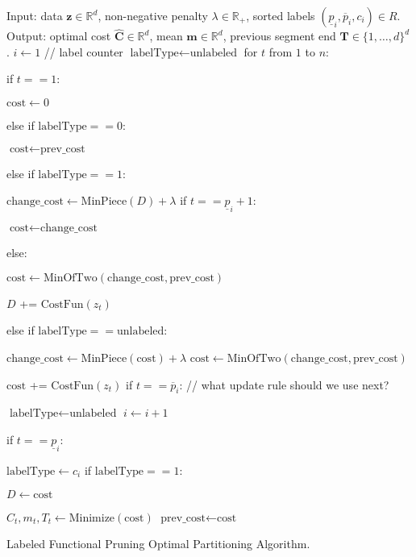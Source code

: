 \documentclass{article}
\newcommand{\RR}{\mathbb R}
\begin{document}
\begin{algorithm}[H]
\begin{algorithmic}[1]
\STATE Input: data $\mathbf z\in\mathbb R^d$, 
non-negative penalty $\lambda\in\RR_+$,
sorted labels $(\underline p_i, \overline p_i, c_i)\in R$.
\STATE Output: optimal cost $\hat{\mathbf C}\in\mathbb R^d$,
mean $\mathbf m\in\mathbb R^d$,
previous segment end $\mathbf T\in\{1,\dots,d\}^d$. 
\STATE $i\gets 1$ // label counter
\STATE $\text{labelType}\gets\text{unlabeled}$
\STATE for $t$ from $1$ to $n$:
\begin{ALC@g}
  \STATE if $t==1$:
  \begin{ALC@g}
    \STATE $\text{cost}\gets 0$
  \end{ALC@g}
  \STATE else if $\text{labelType}==0$:
  \begin{ALC@g}
    \STATE $\text{cost}\gets\text{prev\_cost}$
  \end{ALC@g}
  \STATE else if $\text{labelType}==1$:
  \begin{ALC@g}
    \STATE $\text{change\_cost}\gets \text{MinPiece}(D) + \lambda$
    \STATE if $t==\underline p_i+1$:
    \begin{ALC@g}
      \STATE $\text{cost}\gets\text{change\_cost}$
    \end{ALC@g}
    \STATE else:
    \begin{ALC@g}
      \STATE $\text{cost}\gets\text{MinOfTwo}(
      \text{change\_cost}, \text{prev\_cost})$
    \end{ALC@g}
    \STATE $D$ += $\text{CostFun}(z_t)$
  \end{ALC@g}
  \STATE else if $\text{labelType}==\text{unlabeled}$:
  \begin{ALC@g}
    \STATE $\text{change\_cost}\gets\text{MinPiece}(\text{cost}) + \lambda$
    \STATE $\text{cost}\gets\text{MinOfTwo}( 
    \text{change\_cost}, \text{prev\_cost})$
  \end{ALC@g}
  \STATE $\text{cost}$ += $\text{CostFun}(z_t)$
  \STATE if $t==\overline p_i$: // what update rule should we use next?
  \begin{ALC@g}
    \STATE $\text{labelType}\gets \text{unlabeled}$
    \STATE $i\gets i+1$
  \end{ALC@g}
  \STATE if $t==\underline p_i$:
  \begin{ALC@g}
    \STATE $\text{labelType}\gets c_i$
    \STATE if $\text{labelType}==1$:
    \begin{ALC@g}
      \STATE $D\gets \text{cost}$
    \end{ALC@g}
  \end{ALC@g}
  \STATE $\hat C_t, m_t, T_t\gets \text{Minimize}(\text{cost})$
  \STATE $\text{prev\_cost}\gets\text{cost}$
\end{ALC@g}
\caption{\label{algo:LabeledFPOP}Labeled Functional Pruning Optimal
  Partitioning Algorithm.}
\end{algorithmic}
\end{algorithm}



\end{document}
